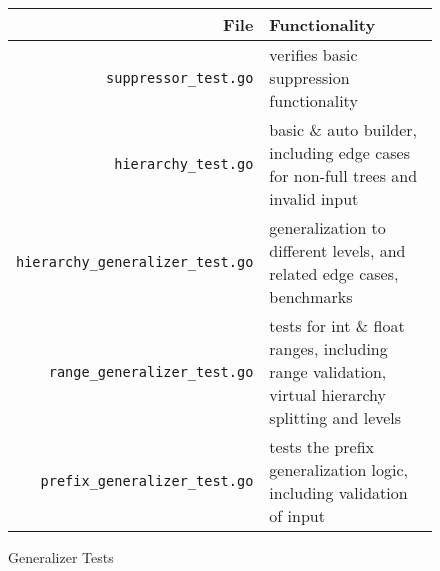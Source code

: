 \begin{figure}[H]
    \centering
    \small
    \begin{tabular}{r p{8cm}}
        \toprule
        \textbf{File} & \textbf{Functionality} \\
        \midrule
        \texttt{suppressor\_test.go}               & verifies basic suppression functionality \\
        \texttt{hierarchy\_test.go}                & basic \& auto builder, including edge cases for non-full trees and invalid input \\
        \texttt{hierarchy\_generalizer\_test.go}   & generalization to different levels, and related edge cases, benchmarks \\
        \texttt{range\_generalizer\_test.go}       & tests for int \& float ranges, including range validation, virtual hierarchy splitting and levels \\
        \texttt{prefix\_generalizer\_test.go}      & tests the prefix generalization logic, including validation of input \\
        \bottomrule
    \end{tabular}
    \caption{Generalizer Tests}\label{fig:generalizer_tests}
\end{figure}